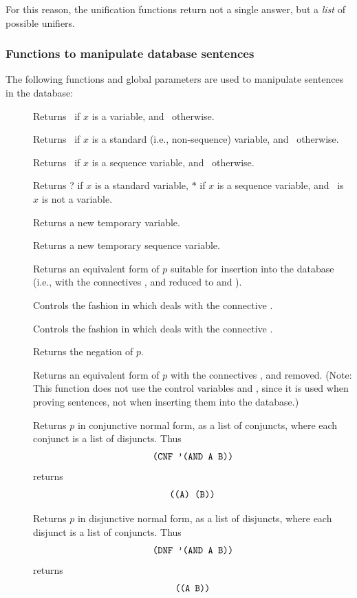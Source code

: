 For this reason, the unification functions return not a single answer,
but a {\em list\/} of possible unifiers.

\subsubsection{Functions to manipulate database sentences}
\label{s.manipulate}

The following functions and global parameters are used to manipulate
sentences in the database:
 \begin{description}
 \item [] Returns \T\ if $x$ is a variable, and
\NIL\ otherwise.
 \item [] Returns \T\ if $x$ is a
standard (i.e., non-sequence) variable, and \NIL\ otherwise.
 \item [] Returns \T\ if $x$ is a
sequence variable, and \NIL\ otherwise.
 \item [] Returns ? if $x$ is a standard variable,
$*$ if $x$ is a sequence variable, and \NIL\ is $x$ is not a
variable.
 \item [] Returns a new
temporary variable.
 \item [] Returns a new
temporary sequence variable.
 \item [] Returns an equivalent form of $p$
suitable for insertion into the database (i.e., with the connectives
,  and \type{<=>} reduced to \type{<=} and \type{=>}).
 \item [] Controls the fashion in which
 deals with the connective .
 \item [] Controls the fashion in which
 deals with the connective \type{<=>}.
 \item [] Returns the negation of $p$.
 \item [] Returns an equivalent form
of $p$ with the connectives \type{<=>},  and 
removed.  (Note: This function does not use the control variables
 and \et, since it is used when proving
sentences, not when inserting them into the database.)
 \item [] Returns $p$ in conjunctive normal form, as a
list of conjuncts, where each conjunct is a list of disjuncts.  Thus
 \[\mbox{\tt (CNF '(AND A B))}\]
returns
 \[\mbox{\tt ((A) (B))}\]
\item [] Returns $p$ in disjunctive normal form, as a list
of disjuncts, where each disjunct is a list of conjuncts.  Thus
 \[\mbox{\tt (DNF '(AND A B))}\]
returns
 \[\mbox{\tt ((A B))}\]
\end{description}

